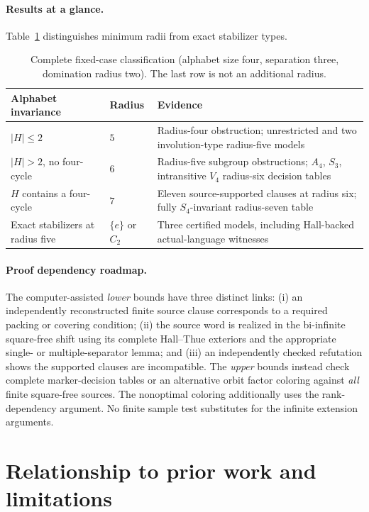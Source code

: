 \documentclass[11pt]{article}
\theoremstyle{remark}
\begin{document}
\paragraph{Results at a glance.}
Table~\ref{tab:main-results} distinguishes
minimum radii from exact stabilizer types.
\begin{table}[htbp]
\centering
\small
\begin{tabular}{@{}p{2.02in}p{0.65in}p{2.80in}@{}}
\toprule
Alphabet invariance & Radius & Evidence\\
\midrule
$|H|\le2$ & $5$ &
Radius-four obstruction; unrestricted and
two involution-type radius-five models\\
$|H|>2$, no four-cycle & $6$ &
Radius-five subgroup obstructions;
$A_4$, $S_3$, intransitive $V_4$
radius-six decision tables\\
$H$ contains a four-cycle & $7$ &
Eleven source-supported clauses at radius six;
fully $S_4$-invariant radius-seven table\\
\midrule
Exact stabilizers at radius five & $\{e\}$ or $C_2$ &
Three certified models, including
Hall-backed actual-language witnesses\\
\bottomrule
\end{tabular}
\caption{Complete fixed-case classification
(alphabet size four, separation three,
domination radius two). The last row is
not an additional radius.}
\label{tab:main-results}
\end{table}

\paragraph{Proof dependency roadmap.}
The computer-assisted \emph{lower} bounds have three distinct
links: (i) an independently reconstructed finite source clause
corresponds to a required packing or covering condition;
(ii) the source word is realized in the bi-infinite square-free
shift using its complete Hall--Thue exteriors and the appropriate
single- or multiple-separator lemma; and (iii) an independently
checked refutation shows the supported clauses are incompatible.
The \emph{upper} bounds instead check complete
marker-decision tables or an alternative orbit
factor coloring against \emph{all} finite square-free
sources. The nonoptimal coloring additionally
uses the rank-dependency argument.
No finite sample test substitutes for the infinite extension
arguments.

\section{Relationship to prior work and limitations}
\end{document}
